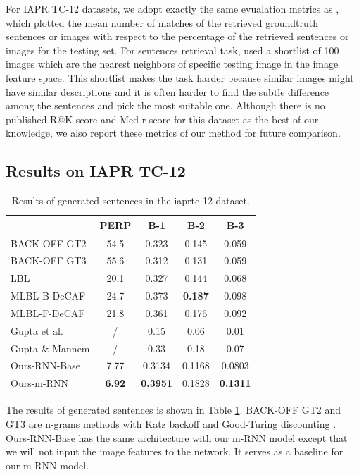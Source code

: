 For IAPR TC-12 datasets, we adopt exactly the same evualation metrics as \cite{kiros2013multimodal}, which plotted the mean number of matches of the retrieved groundtruth sentences or images with respect to the percentage of the retrieved sentences or images for the testing set.
For sentences retrieval task, \cite{kiros2013multimodal} used a shortlist of 100 images which are the nearest neighbors of specific testing image in the image feature space.
This shortlist makes the task harder because similar images might have similar descriptions and it is often harder to find the subtle difference among the sentences and pick the most suitable one.
Although there is no published R@K score and Med r score for this dataset as the best of our knowledge, we also report these metrics of our method for future comparison.

\subsection{Results on IAPR TC-12}

\begin{table}[htb]
	\centering
\begin{tabular}{l|cccc}
\hline
      & PERP  & B-1   & B-2   & B-3 \\
\hline
BACK-OFF GT2 & 54.5  & 0.323 & 0.145 & 0.059 \\
BACK-OFF GT3 & 55.6  & 0.312 & 0.131 & 0.059 \\
LBL \cite{mnih2007three}  & 20.1  & 0.327 & 0.144 & 0.068 \\
MLBL-B-DeCAF \cite{kiros2013multimodal} & 24.7  & 0.373 & \textbf{0.187} & 0.098 \\
MLBL-F-DeCAF \cite{kiros2013multimodal} & 21.8  & 0.361 & 0.176 & 0.092 \\
Gupta et al. \cite{gupta2012choosing} & /     & 0.15  & 0.06  & 0.01 \\
Gupta \& Mannem \cite{gupta2012image} & /     & 0.33  & 0.18  & 0.07 \\
\hdashline
Ours-RNN-Base & 7.77  & 0.3134 & 0.1168 & 0.0803 \\
Ours-m-RNN & \textbf{6.92} & \textbf{0.3951} & 0.1828 & \textbf{0.1311} \\
\hline
\end{tabular}%
	\caption{Results of generated sentences in the iaprtc-12 dataset. }
	\label{tab:iaprtc_gen}
\end{table}

The results of generated sentences is shown in Table \ref{tab:iaprtc_gen}.
BACK-OFF GT2 and GT3 are n-grams methods with Katz backoff and Good-Turing discounting \cite{chen2000survey,kiros2013multimodal}.
Ours-RNN-Base has the same architecture with our m-RNN model except that we will not input the image features to the network.
It serves as a baseline for our m-RNN model.


